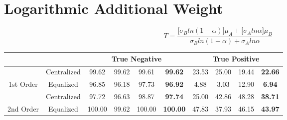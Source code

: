 \documentclass[10pt,a4paper]{article}
\begin{document}
	\section{Logarithmic Additional Weight}
		$$
		T = \frac{\big[\sigma_B ln(1 - \alpha)\big] \mu_A
			+ \big[\sigma_A ln\alpha\big] \mu_B}
		{\sigma_B ln(1 - \alpha) + \sigma_A ln\alpha}
		$$
		\begin{table}[!h]
			\centering
			\begin{tabular}{|c|c|c|c|c|c|c|c|c|c|}
				\hline
				&             & \multicolumn{4}{c|}{True Negative}                               & \multicolumn{4}{c|}{True Positive}                            \\ \hline
				& Centralized & 99.62  & 99.62 & 99.61  & {\color[HTML]{FE0000} \textbf{99.62}}  & 23.53 & 25.00 & 19.44 & {\color[HTML]{FE0000} \textbf{22.66}} \\ \cline{2-10} 
				\multirow{-2}{*}{1st Order} & Equalized   & 96.85  & 96.18 & 97.73  & {\color[HTML]{FE0000} \textbf{96.92}}  & 4.88  & 3.03  & 12.90 & {\color[HTML]{FE0000} \textbf{6.94}}  \\ \hline
				& Centralized & 97.72  & 96.63 & 98.87  & {\color[HTML]{FE0000} \textbf{97.74}}  & 25.00 & 42.86 & 48.28 & {\color[HTML]{FE0000} \textbf{38.71}} \\ \cline{2-10} 
				\multirow{-2}{*}{2nd Order} & Equalized   & 100.00 & 99.62 & 100.00 & {\color[HTML]{FE0000} \textbf{100.00}} & 47.83 & 37.93 & 46.15 & {\color[HTML]{FE0000} \textbf{43.97}} \\ \hline
			\end{tabular}
		\end{table}
	
\end{document}
